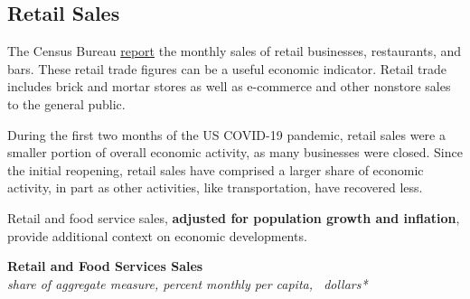 \documentclass{report}
\begin{document}
{\begin{minipage}{1.0\textwidth}
\subsection*{Retail Sales} 
\small The Census Bureau \href{https://www.census.gov/retail/index.html}{report} the monthly sales of retail businesses, restaurants, and bars. These retail trade figures can be a useful economic indicator. Retail trade includes brick and mortar stores as well as e-commerce and other nonstore sales to the general public. 

 During the first two months of the US COVID-19 pandemic, retail sales were a smaller portion of overall economic activity, as many businesses were closed. Since the initial reopening, retail sales have comprised a larger share of economic activity, in part as other activities, like transportation, have recovered less. 

Retail and food service sales, \textbf{adjusted for population growth and inflation}, provide additional context on economic developments. 
\vspace{0.5mm}

\normalsize \textbf{Retail and Food Services Sales}\\
\footnotesize{\textit{share of aggregate measure, percent \hspace{19mm} monthly per capita, \unskip \ dollars*}}
\vspace{3.0cm}


\end{minipage}}
\end{document}
